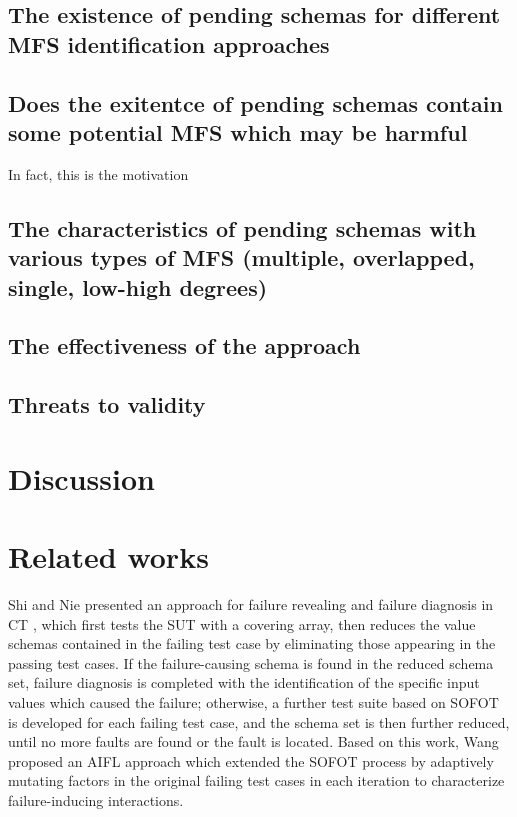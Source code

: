 {%
%

\subsection{The existence of pending schemas for different MFS identification approaches}

%

\subsection{Does the exitentce of pending schemas contain some potential MFS which may be harmful}
In fact, this is the motivation


\subsection{The characteristics of pending schemas with various types of MFS (multiple, overlapped, single, low-high degrees)}



\subsection{The effectiveness of the approach}



\subsection{Threats to validity}


\section{Discussion}\label{sec:discussion}


\section{Related works}\label{sec:related}
Shi and Nie \cite{shi2005software} presented an approach for failure revealing and failure diagnosis in CT , which first tests the SUT with a covering array, then reduces the value schemas contained in the failing test case by eliminating those appearing in the passing test cases. If the failure-causing schema is found in the reduced schema set, failure diagnosis is completed with the identification of the specific input values which caused the failure; otherwise, a further test suite based on SOFOT is developed for each failing test case, and the schema set is then further reduced, until no more faults are found or the fault is located. Based on this work, Wang \cite{wang2010adaptive} proposed an AIFL approach which extended the SOFOT process by adaptively mutating factors in the original failing test cases in each iteration to characterize failure-inducing interactions.

}
